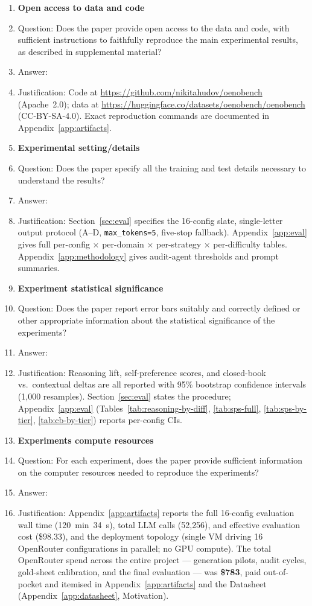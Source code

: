 \begin{enumerate}
\item {\bf Open access to data and code}
    \item[] Question: Does the paper provide open access to the data and code, with sufficient instructions to faithfully reproduce the main experimental results, as described in supplemental material?
    \item[] Answer: \answerYes{}
    \item[] Justification: Code at \url{https://github.com/nikitahudov/oenobench} (Apache~2.0); data at \url{https://huggingface.co/datasets/oenobench/oenobench} (CC-BY-SA-4.0). Exact reproduction commands are documented in Appendix~\ref{app:artifacts}.

\item {\bf Experimental setting/details}
    \item[] Question: Does the paper specify all the training and test details necessary to understand the results?
    \item[] Answer: \answerYes{}
    \item[] Justification: Section~\ref{sec:eval} specifies the 16-config slate, single-letter output protocol (A--D, \texttt{max\_tokens=5}, five-stop fallback). Appendix~\ref{app:eval} gives full per-config × per-domain × per-strategy × per-difficulty tables. Appendix~\ref{app:methodology} gives audit-agent thresholds and prompt summaries.

\item {\bf Experiment statistical significance}
    \item[] Question: Does the paper report error bars suitably and correctly defined or other appropriate information about the statistical significance of the experiments?
    \item[] Answer: \answerYes{}
    \item[] Justification: Reasoning lift, self-preference scores, and closed-book vs.\ contextual deltas are all reported with 95\% bootstrap confidence intervals (1{,}000 resamples). Section~\ref{sec:eval} states the procedure; Appendix~\ref{app:eval} (Tables~\ref{tab:reasoning-by-diff}, \ref{tab:sps-full}, \ref{tab:sps-by-tier}, \ref{tab:cb-by-tier}) reports per-config CIs.

\item {\bf Experiments compute resources}
    \item[] Question: For each experiment, does the paper provide sufficient information on the computer resources needed to reproduce the experiments?
    \item[] Answer: \answerYes{}
    \item[] Justification: Appendix~\ref{app:artifacts} reports the full 16-config evaluation wall time (120~min~34~s), total LLM calls (52{,}256), and effective evaluation cost (\$98.33), and the deployment topology (single VM driving 16 OpenRouter configurations in parallel; no GPU compute). The total OpenRouter spend across the entire project --- generation pilots, audit cycles, gold-sheet calibration, and the final evaluation --- was \textbf{\$783}, paid out-of-pocket and itemised in Appendix~\ref{app:artifacts} and the Datasheet (Appendix~\ref{app:datasheet}, Motivation).


\end{enumerate}
